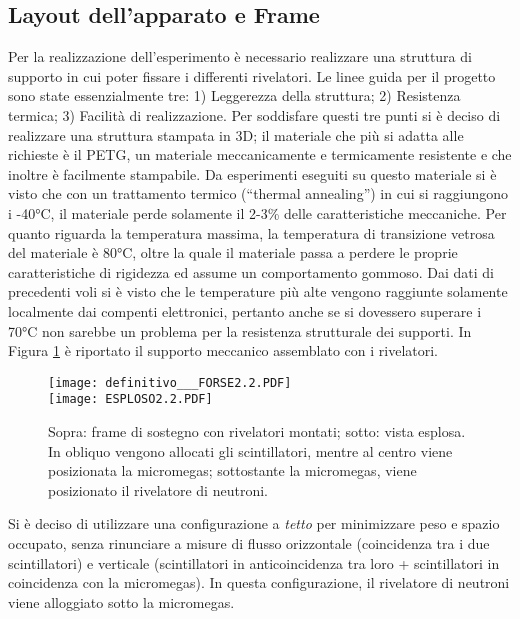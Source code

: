 \subsection{Layout dell'apparato e Frame}

Per la realizzazione dell’esperimento è necessario realizzare una struttura di supporto in cui poter fissare i differenti rivelatori. Le linee guida per il progetto sono state essenzialmente tre: 1) Leggerezza della struttura; 2) Resistenza termica; 3) Facilità di realizzazione. Per soddisfare questi tre punti si è deciso di realizzare una struttura stampata in 3D; il materiale che più si adatta alle richieste è il PETG, un materiale meccanicamente e termicamente resistente e che inoltre è facilmente stampabile. 
Da esperimenti eseguiti su questo materiale si è visto che con un trattamento termico (“thermal annealing”) in cui si raggiungono i -40°C, il materiale perde solamente il 2-3\% delle caratteristiche meccaniche. Per quanto riguarda la temperatura massima, la temperatura di transizione vetrosa del materiale è 80°C, oltre la quale il materiale passa a perdere le proprie caratteristiche di rigidezza ed assume un comportamento gommoso. Dai dati di precedenti voli si è visto che le temperature più alte vengono raggiunte solamente localmente dai compenti elettronici, pertanto anche se si dovessero superare i 70°C non sarebbe un problema per la resistenza strutturale dei supporti. 
In Figura \ref{frame} è riportato il supporto meccanico assemblato con i rivelatori.
\begin{figure}
    \centering
    \texttt{[image: definitivo\_\_\_FORSE2.2.PDF]}
    \\
    \texttt{[image: ESPLOSO2.2.PDF]}

    \caption{Sopra: frame di sostegno con rivelatori montati; sotto: vista esplosa. In obliquo vengono allocati gli scintillatori, mentre al centro viene posizionata la micromegas; sottostante la micromegas, viene posizionato il rivelatore di neutroni.}
    \label{frame}
\end{figure}
Si è deciso di utilizzare una configurazione a \emph{tetto} per minimizzare peso e spazio occupato, senza rinunciare a misure di flusso orizzontale (coincidenza tra i due scintillatori) e verticale (scintillatori in anticoincidenza tra loro + scintillatori in coincidenza con la micromegas).
In questa configurazione, il rivelatore di neutroni viene alloggiato sotto la micromegas.
